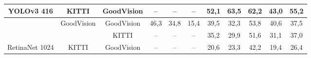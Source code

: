\documentclass[twoside]{ctuthesis}
\theoremstyle{plain}
\theoremstyle{definition}
\theoremstyle{note}
\begin{document}
\begin{table}
{\begin{tabular}{|c|c|c|c|c|c|c|c|c|c|c|}
\multirow{-3}{*}{YOLOv3 416}                             & \multirow{-2}{*}{KITTI}                                             & GoodVision                                                         & --                                                                     & --                                                                 & --                                                                        & 52,1                                                               & 63,5                                                                  & 62,2                                                                 & 43,0                                                               & 55,2                                                            \\ \hline
                                                         & GoodVision                                                          & GoodVision                                                         & 46,3                                                                   & 34,8                                                               & 15,4                                                                      & 39,5                                                               & 32,3                                                                  & 53,8                                                                 & 40,6                                                               & 37,5                                                            \\ \cline{2-11} 
                                                         &                                                                     & KITTI                                                              & --                                                                     & --                                                                 & --                                                                        & 35,2                                                               & 29,9                                                                  & 51,6                                                                 & 31,1                                                               & 37,0                                                            \\ \cline{3-11} 
\multirow{-3}{*}{RetinaNet 1024}                         & \multirow{-2}{*}{KITTI}                                             & GoodVision                                                         & --                                                                     & --                                                                 & --                                                                        & 20,6                                                               & 23,3                                                                  & 42,2                                                                 & 19,4                                                               & 26,4                                                            \\ \hline

\end{tabular}}
\end{table}
\end{document}
